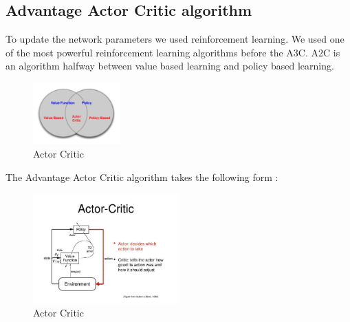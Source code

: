 \subsection{Advantage Actor Critic algorithm}

To update the network parameters we used reinforcement learning. We used one of the most powerful reinforcement learning algorithms before the A3C. A2C is an algorithm halfway between value based learning and policy based learning.
\begin{figure}[!htb]
    \centering
    \includegraphics[width=0.3\textwidth]{imgs/actro.png}
    \caption{\label{fig:method} Actor Critic}
\end{figure}

The Advantage Actor Critic algorithm takes the following form :

\begin{figure}[!htb]
    \centering
    \includegraphics[width=0.5\textwidth]{imgs/actor_critic.jpeg}
    \caption{\label{fig:method} Actor Critic}
\end{figure}

